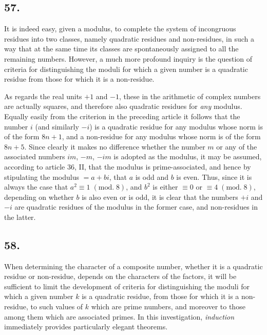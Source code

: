 \documentclass[twoside,12pt, showframe]{memoir}
\renewcommand{\pmod}[1]{\;(\textrm{mod.}\;#1)}
\begin{document}
\subsection*{57.}

It is indeed easy, given a modulus, to complete the system of incongruous residues into two classes, namely quadratic residues and non-residues, in such a way that at the same time its classes are spontaneously assigned to all the remaining numbers. However, a much more profound inquiry is the question of criteria for distinguishing the moduli for which a given number is a quadratic residue from those for which it is a non-residue.

As regards the real units \(+1\) and \(-1\), these in the arithmetic of complex numbers are actually squares, and therefore also quadratic residues for \textit{any} modulus. Equally easily from the criterion in the preceding article it follows that the number \(i\) (and similarly \(-i\)) is a quadratic residue for any modulus whose norm is of the form \(8n+1\), and a non-residue for any modulus whose norm is of the form \(8n+5\). Since clearly it makes no difference whether the number \(m\) or any of the associated numbers \(im\), \(-m\), \(-im\) is adopted as the modulus, it may be assumed, according to article 36, II, that the modulus is prime-associated, and hence by stipulating the modulus \(=a+bi\), that \(a\) is odd and \(b\) is even. Thus, since it is always the case that \(a^2\equiv 1\pmod{8}\), and \(b^2\) is either \(\equiv 0\) or \(\equiv 4\pmod{8}\), depending on whether \(b\) is also even or is odd, it is clear that the numbers \(+i\) and \(-i\) are quadratic residues of the modulus in the former case, and non-residues in the latter.
%

\subsection*{58.}
 
When determining the character of a composite number, whether it is a quadratic residue or non-residue, depends on the characters of the factors, it will be sufficient to limit the development of criteria for distinguishing the moduli for which a given number \(k\) is a quadratic residue, from those for which it is a non-residue, to such values of \(k\) which are prime numbers, and moreover to those among them which are associated primes. In this investigation, \textit{induction} immediately provides particularly elegant theorems.
%
\end{document}
